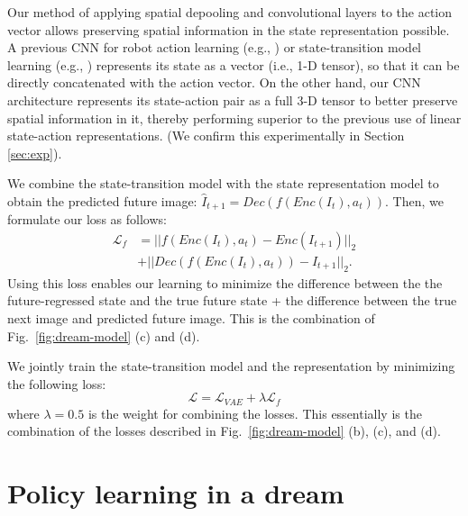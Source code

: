 \documentclass[letterpaper, 10 pt, conference]{ieeeconf}
\begin{document}
Our method of applying spatial depooling and convolutional layers to the action vector allows preserving spatial information in the state representation possible.
A previous CNN for robot action learning (e.g., \cite{finn2017deep}) or state-transition model learning (e.g., \cite{ha2018world}) represents its state as a vector (i.e., 1-D tensor), so that it can be directly concatenated with the action vector.
On the other hand, our CNN architecture represents its state-action pair as a full 3-D tensor to better preserve spatial information in it, thereby performing superior to the previous use of linear state-action representations. (We confirm this experimentally in Section \ref{sec:exp}).

We combine the state-transition model with the state representation model to obtain the predicted future image: $\hat{I}_{t+1} = Dec(f(Enc(I_t), a_t))$. 
Then, we formulate our loss as follows:
\begin{equation}
\begin{split}
        \mathcal{L}_{f} &= ||f(Enc(I_t), a_t) - Enc(I_{t+1})||_2 \\
        &+ ||Dec(f(Enc(I_t), a_t)) - I_{t+1}||_2.
\end{split}
\end{equation}
Using this loss enables our learning to minimize the difference between the the future-regressed state and the true future state + the difference between the true next image and predicted future image. This is the combination of Fig.~\ref{fig:dream-model} (c) and (d). 

We jointly train the state-transition model and the representation by minimizing the following loss:
\begin{equation}
\mathcal{L} = \mathcal{L}_{VAE} + \lambda \mathcal{L}_f    
\end{equation}
where $\lambda=0.5$ is the weight for combining the losses. This essentially is the combination of the losses described in Fig.~\ref{fig:dream-model} (b), (c), and (d). 






\section{Policy learning in a dream}
\end{document}
